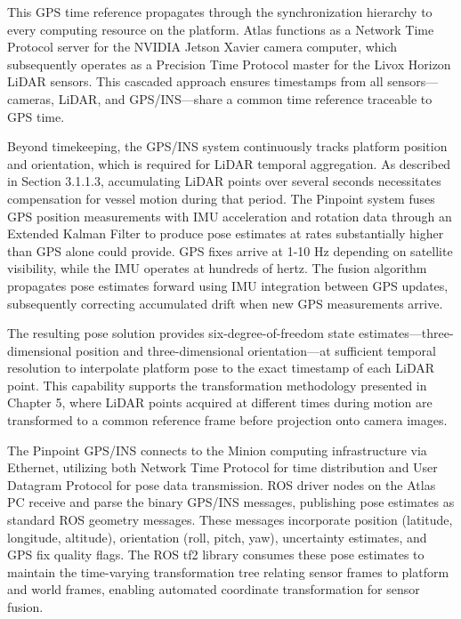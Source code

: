 \documentclass{erauthesis}
\begin{document}
This \ac{GPS} time reference propagates through the synchronization hierarchy to every computing resource on the platform.
Atlas functions as a Network Time Protocol server for the NVIDIA Jetson Xavier camera computer, which subsequently operates as a Precision Time Protocol master for the Livox Horizon \ac{LiDAR} sensors.
This cascaded approach ensures timestamps from all sensors—cameras, \ac{LiDAR}, and \ac{GPS}/\ac{INS}—share a common time reference traceable to \ac{GPS} time.

Beyond timekeeping, the \ac{GPS}/\ac{INS} system continuously tracks platform position and orientation, which is required for \ac{LiDAR} temporal aggregation.
As described in Section 3.1.1.3, accumulating \ac{LiDAR} points over several seconds necessitates compensation for vessel motion during that period.
The Pinpoint system fuses \ac{GPS} position measurements with \ac{IMU} acceleration and rotation data through an Extended Kalman Filter to produce pose estimates at rates substantially higher than \ac{GPS} alone could provide.
\ac{GPS} fixes arrive at 1-10 Hz depending on satellite visibility, while the \ac{IMU} operates at hundreds of hertz.
The fusion algorithm propagates pose estimates forward using \ac{IMU} integration between \ac{GPS} updates, subsequently correcting accumulated drift when new \ac{GPS} measurements arrive.

The resulting pose solution provides six-degree-of-freedom state estimates—three-dimensional position and three-dimensional orientation—at sufficient temporal resolution to interpolate platform pose to the exact timestamp of each \ac{LiDAR} point.
This capability supports the transformation methodology presented in Chapter 5, where \ac{LiDAR} points acquired at different times during motion are transformed to a common reference frame before projection onto camera images.

The Pinpoint \ac{GPS}/\ac{INS} connects to the Minion computing infrastructure via Ethernet, utilizing both Network Time Protocol for time distribution and User Datagram Protocol for pose data transmission.
\ac{ROS} driver nodes on the Atlas PC receive and parse the binary \ac{GPS}/\ac{INS} messages, publishing pose estimates as standard \ac{ROS} geometry messages.
These messages incorporate position (latitude, longitude, altitude), orientation (roll, pitch, yaw), uncertainty estimates, and \ac{GPS} fix quality flags.
The \ac{ROS} tf2 library consumes these pose estimates to maintain the time-varying transformation tree relating sensor frames to platform and world frames, enabling automated coordinate transformation for sensor fusion.
\end{document}
